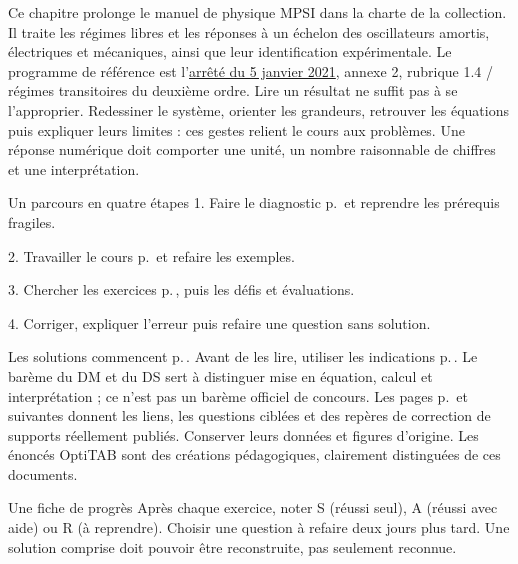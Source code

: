 \thispagestyle{mpsiFront}
Ce chapitre prolonge le manuel de physique MPSI dans la charte de la collection. Il traite les régimes libres et les réponses à un échelon des oscillateurs amortis, électriques et mécaniques, ainsi que leur identification expérimentale. Le programme de référence est l’\href{https://www.education.gouv.fr/bo/21/Special1/ESRS2035779A.htm}{arrêté du 5 janvier 2021}, annexe 2, rubrique 1.4 / régimes transitoires du deuxième ordre.
Lire un résultat ne suffit pas à se l’approprier. Redessiner le système, orienter les grandeurs, retrouver les équations puis expliquer leurs limites : ces gestes relient le cours aux problèmes. Une réponse numérique doit comporter une unité, un nombre raisonnable de chiffres et une interprétation.
\begin{loi}{Un parcours en quatre étapes}
1. Faire le diagnostic p.\,\pageref{diagnostic} et reprendre les prérequis fragiles.\par
2. Travailler le cours p.\,\pageref{cours-1} et refaire les exemples.\par
3. Chercher les exercices p.\,\pageref{td1}, puis les défis et évaluations.\par
4. Corriger, expliquer l’erreur puis refaire une question sans solution.
\end{loi}
Les solutions commencent p.\,\pageref{corr-diag}. Avant de les lire, utiliser les indications p.\,\pageref{indices}. Le barème du DM et du DS sert à distinguer mise en équation, calcul et interprétation ; ce n’est pas un barème officiel de concours.
Les pages p.\,\pageref{sources-1} et suivantes donnent les liens, les questions ciblées et des repères de correction de supports réellement publiés. Conserver leurs données et figures d’origine. Les énoncés OptiTAB sont des créations pédagogiques, clairement distinguées de ces documents.
\begin{methode}{Une fiche de progrès}
Après chaque exercice, noter S (réussi seul), A (réussi avec aide) ou R (à reprendre). Choisir une question à refaire deux jours plus tard. Une solution comprise doit pouvoir être reconstruite, pas seulement reconnue.
\end{methode}


